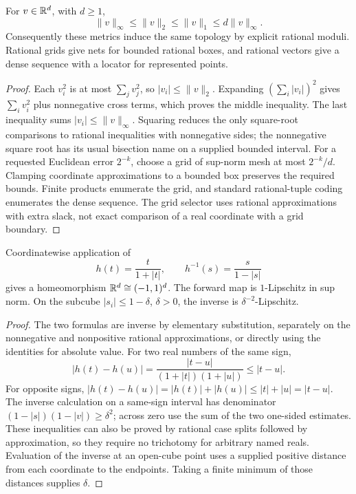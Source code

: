 \begin{proposition}
\label{prop:euclidean-norms}
For $v\in\mathbb R^d$, with $d\geq1$,
\[
 \|v\|_\infty\leq\|v\|_2\leq\|v\|_1
 \leq d\|v\|_\infty.
\]
Consequently these metrics induce the same topology by explicit rational
moduli.  Rational grids give nets for bounded rational boxes, and rational
vectors give a dense sequence with a locator for represented points.
\end{proposition}
\begin{proof}
Each $v_i^2$ is at most $\sum_jv_j^2$, so
$|v_i|\leq\|v\|_2$.  Expanding
$(\sum_i|v_i|)^2$ gives $\sum_iv_i^2$ plus nonnegative cross terms,
which proves the middle inequality.  The last inequality sums
$|v_i|\leq\|v\|_\infty$.  Squaring reduces the only square-root
comparisons to rational inequalities with nonnegative sides; the
nonnegative square root has its usual bisection name on a supplied bounded
interval.  For a requested Euclidean error $2^{-k}$, choose a grid of
sup-norm mesh at most $2^{-k}/d$.  Clamping coordinate approximations
to a bounded box preserves the required bounds.  Finite products enumerate
the grid, and standard rational-tuple coding enumerates the dense sequence.
The grid selector uses rational approximations with extra slack, not exact
comparison of a real coordinate with a grid boundary.
\end{proof}

\begin{proposition}\label{prop:euclidean-open-cube}
Coordinatewise application of
\[
 h(t)=\frac{t}{1+|t|},\qquad h^{-1}(s)=\frac{s}{1-|s|}
\]
gives a homeomorphism $\mathbb R^d\cong(-1,1)^d$.  The forward map is
$1$-Lipschitz in sup norm.  On the subcube $|s_i|\leq1-\delta$,
$\delta>0$, the inverse is $\delta^{-2}$-Lipschitz.
\end{proposition}
\begin{proof}
The two formulas are inverse by elementary substitution, separately on
the nonnegative and nonpositive rational approximations, or directly
using the identities for absolute value.  For two real numbers of the
same sign,
\[
 |h(t)-h(u)|=\frac{|t-u|}{(1+|t|)(1+|u|)}\leq|t-u|.
\]
For opposite signs, $|h(t)-h(u)|=|h(t)|+|h(u)|\leq|t|+|u|=|t-u|$.
The inverse calculation on a same-sign interval has denominator
$(1-|s|)(1-|v|)\geq\delta^2$; across zero use the sum of the two
one-sided estimates.  These inequalities can also be proved by rational
case splits followed by approximation, so they require no trichotomy for
arbitrary named reals.  Evaluation of the inverse at an open-cube point
uses a supplied positive distance from each coordinate to the endpoints.
Taking a finite minimum of those distances supplies $\delta$.
\end{proof}

